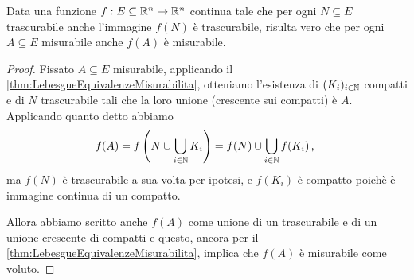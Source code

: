 \begin{proposition}\label{prop:ContinueSpecialiTengonoMisurabili}
	Data una funzione $f:E\subseteq\mathbb R^n\to\mathbb R^n$ continua tale che per ogni $N\subseteq E$ trascurabile anche l'immagine $f(N)$ è trascurabile, risulta vero che per ogni $A\subseteq E$ misurabile anche $f(A)$ è misurabile.
\end{proposition}
\begin{proof}
	Fissato $A\subseteq E$ misurabile, applicando il \cref{thm:LebesgueEquivalenzeMisurabilita}, otteniamo l'esistenza di $(K_i)_{i\in\mathbb N}$ compatti e di $N$ trascurabile tali che la loro unione (crescente sui compatti) è $A$. Applicando quanto detto abbiamo
	\begin{equation*}
		f(A)=f\left(N\cup\bigcup_{i\in\mathbb N}K_i\right)=f(N)\cup\bigcup_{i\in\mathbb N}f(K_i) \, \text{, }
	\end{equation*}
	ma $f(N)$ è trascurabile a sua volta per ipotesi, e $f(K_i)$ è compatto poichè è immagine continua di un compatto.
	
	Allora abbiamo scritto anche $f(A)$ come unione di un trascurabile e di un unione crescente di compatti e questo, ancora per il \cref{thm:LebesgueEquivalenzeMisurabilita}, implica che $f(A)$ è misurabile come voluto.
\end{proof}

